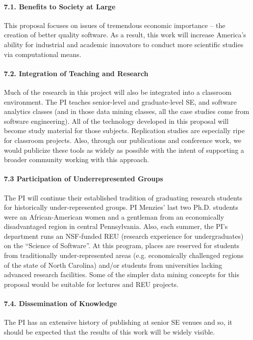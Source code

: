 \paragraph{7.1. Benefits to Society at Large}
This proposal focuses on issues of
tremendous economic importance -- the creation of better quality software.
As a result, this work will increase America's ability for industrial and academic innovators to conduct
more scientific studies via computational means.  
 

\paragraph{7.2. Integration of Teaching and Research}
Much of the research in this project will also be integrated into a
classroom environment.  The PI teaches senior-level and graduate-level
SE, and software analytics   classes (and in those data mining
classes, all the case studies come from software engineering). All of
the technology developed in this proposal will become study
material for those subjects.  Replication studies are especially ripe
for classroom projects.  Also, through our publications and conference
work, we would publicize these tools as widely as possible with the
intent of supporting a broader community working with this approach.

\paragraph{7.3 Participation of Underrepresented
  Groups} The PI will continue their established tradition of
graduating research students for historically under-represented
groups.  PI Menzies' last two Ph.D. students were an African-American
women and a gentleman from an economically disadvantaged region
in central Pennsylvania.  Also, each summer, the PI's department runs an NSF-funded REU
 (research experience for undergraduates)
on the ``Science of Software''.
 At this
program, places are reserved for students from traditionally
under-represented areas (e.g. economically challenged regions of the
state of North Carolina) and/or students from universities
lacking advanced research  facilities.
Some of the simpler data mining concepts for this proposal would be suitable for lectures and REU projects.



%
\paragraph{7.4. Dissemination of Knowledge}
 The PI has an extensive history of publishing at senior SE venues and so, it should be expected
that the results of this work will be widely visible.

